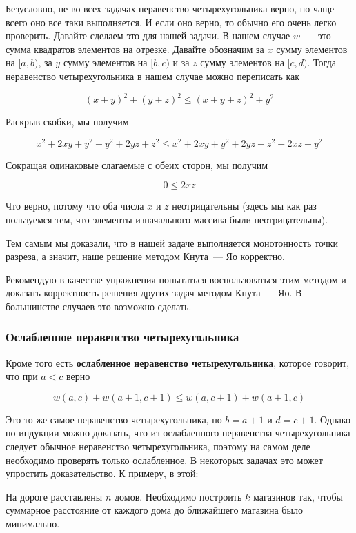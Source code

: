Безусловно, не во всех задачах неравенство четырехугольника верно, но чаще всего оно все таки выполняется. И если оно верно, то обычно его очень легко проверить. Давайте сделаем это для нашей задачи. В нашем случае $w$~--- это сумма квадратов элементов на отрезке. Давайте обозначим за $x$ сумму элементов на $[a, b)$, за $y$ сумму элементов на $[b, c)$ и за $z$ сумму элементов на $[c, d)$. Тогда неравенство четырехугольника в нашем случае можно переписать как

$$(x + y)^2 + (y + z)^2 \le (x + y + z)^2 + y^2$$

Раскрыв скобки, мы получим

$$x^2 + 2xy + y^2 + y^2 + 2yz + z^2 \le x^2 + 2xy + y^2 + 2yz + z^2 + 2xz + y^2$$

Сокращая одинаковые слагаемые с обеих сторон, мы получим

$$0 \le 2xz$$

Что верно, потому что оба числа $x$ и $z$ неотрицательны (здесь мы как раз пользуемся тем, что элементы изначального массива были неотрицательны).

Тем самым мы доказали, что в нашей задаче выполняется монотонность точки разреза, а значит, наше решение методом Кнута~--- Яо корректно.

Рекомендую в качестве упражнения попытаться воспользоваться этим методом и доказать корректность решения других задач методом Кнута~--- Яо. В большинстве случаев это возможно сделать.

\subsubsection{Ослабленное неравенство четырехугольника}

Кроме того есть \textbf{ослабленное неравенство четырехугольника}, которое говорит, что при $a < c$ верно

$$w(a, c) + w(a + 1, c + 1) \le w(a, c + 1) + w(a + 1, c)$$

Это то же самое неравенство четырехугольника, но $b = a + 1$ и $d = c + 1$. Однако по индукции можно доказать, что из ослабленного неравенства четырехугольника следует обычное неравенство четырехугольника, поэтому на самом деле необходимо проверять только ослабленное. В некоторых задачах это может упростить доказательство. К примеру, в этой:

\begin{problem}
    На дороге расставлены $n$ домов. Необходимо построить $k$ магазинов так, чтобы суммарное расстояние от каждого дома до ближайшего магазина было минимально.
\end{problem}


